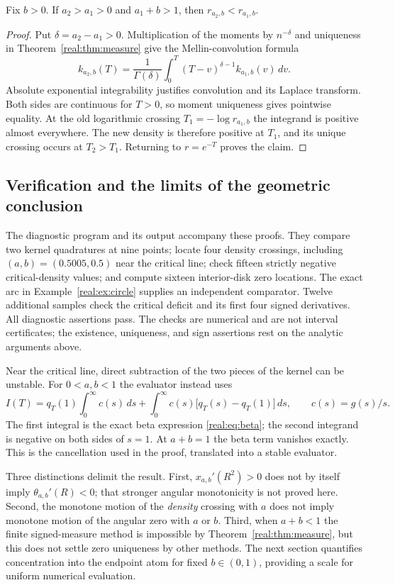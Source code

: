 \begin{corollary}
\label{real:cor:order-motion}
Fix $b>0$. If $a_2>a_1>0$ and $a_1+b>1$, then
$r_{a_2,b}<r_{a_1,b}$.
\end{corollary}
\begin{proof}
Put $\delta=a_2-a_1>0$. Multiplication of the moments by
$n^{-\delta}$ and uniqueness in Theorem~\ref{real:thm:measure}
give the Mellin-convolution formula
\[
 k_{a_2,b}(T)=\frac1{\Gamma(\delta)}
   \int_0^T(T-v)^{\delta-1}k_{a_1,b}(v)\,dv.
\]
Absolute exponential integrability justifies convolution and its
Laplace transform. Both sides are continuous for $T>0$, so moment
uniqueness gives pointwise equality. At the old logarithmic crossing
$T_1=-\log r_{a_1,b}$ the integrand is positive almost everywhere.
The new density is therefore positive at $T_1$, and its unique
crossing occurs at $T_2>T_1$. Returning to $r=e^{-T}$ proves the
claim.
\end{proof}

\subsection{Verification and the limits of the geometric conclusion}

The diagnostic program  and its
output  accompany these proofs.
They compare two kernel quadratures at nine points; locate four density
crossings, including $(a,b)=(0.5005,0.5)$ near the critical line; check
fifteen strictly negative critical-density values; and compute sixteen
interior-disk zero locations. The exact arc in
Example~\ref{real:ex:circle} supplies an independent comparator.
Twelve additional samples check the critical deficit and its first
four signed derivatives. All diagnostic assertions pass. The checks
are numerical and are not interval certificates; the existence,
uniqueness, and sign assertions rest on the analytic arguments above.

Near the critical line, direct subtraction of the two pieces of the
kernel can be unstable. For $0<a,b<1$ the evaluator instead uses
\[
 I(T)=q_T(1)\int_0^\infty c(s)\,ds
       +\int_0^\infty c(s)\bigl[q_T(s)-q_T(1)\bigr]\,ds,\qquad
 c(s)=g(s)/s.
\]
The first integral is the exact beta expression
\eqref{real:eq:beta}; the second integrand is negative on both
sides of $s=1$. At $a+b=1$ the beta term vanishes exactly. This is
the cancellation used in the proof, translated into a stable evaluator.

Three distinctions delimit the result. First,
$x_{a,b}'(R^2)>0$ does not by itself imply
$\theta_{a,b}'(R)<0$; that stronger angular monotonicity is not proved
here. Second, the monotone motion of the \emph{density} crossing with
$a$ does not imply monotone motion of the angular zero with $a$ or
$b$. Third, when $a+b<1$ the finite signed-measure method is
impossible by Theorem~\ref{real:thm:measure}, but this does not settle
zero uniqueness by other methods. The next section quantifies concentration into the endpoint atom
for fixed $b\in(0,1)$, providing a scale for uniform numerical evaluation.
